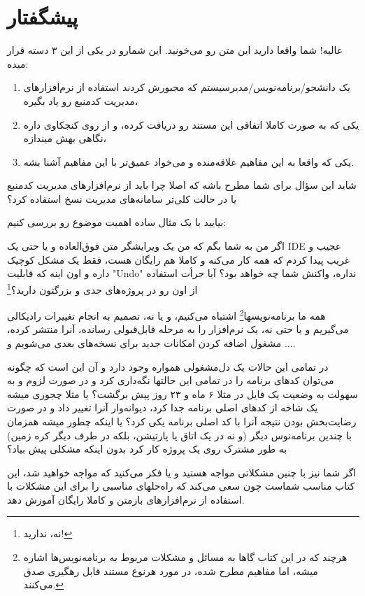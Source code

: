 \chapter{پیشگفتار}
عالیه! شما واقعا دارید این متن رو می‌خونید. این شمارو در یکی از این ۳ دسته قرار میده:
\begin{enumerate}
\item یک دانشجو/برنامه‌نویس/مدیرسیستم که مجبورش کردند استفاده از نرم‌افزارهای مدیریت کدمنبع رو یاد بگیره،
\item یکی که به صورت کاملا اتفاقی این مستند رو دریافت کرده،‌ و از روی کنجکاوی داره نگاهی بهش میندازه،
\item یکی که واقعا به این مفاهیم علاقه‌منده و می‌خواد عمیق‌تر با این مفاهیم آشنا بشه.
\end{enumerate}

شاید این سؤال برای شما مطرح باشه که اصلا چرا باید از نرم‌افزارهای مدیریت کد‌منبع یا در حالت کلی‌تر سامانه‌های مدیریت نسخ استفاده کرد؟

بیایید با یک مثال ساده اهمیت موضوع رو بررسی کنیم:

اگر من به شما بگم که من یک ویرایشگر متن فوق‌العاده و یا حتی یک IDE عجیب و غریب پیدا کردم که همه کار می‌کنه و کاملا هم رایگان هست، فقط یک مشکل کوچیک داره و اون اینه که قابلیت "Undo" نداره، واکنش شما چه خواهد بود؟ آیا جرأت استفاده از اون رو در پروژه‌های جدی و بزرگتون دارید؟\footnote{ نه، ندارید!}

همه ما برنامه‌نویسها\footnote{هرچند که در این کتاب گاها به مسائل و مشکلات مربوط به برنامه‌نویس‌ها اشاره میشه، اما مفاهیم مطرح شده، در مورد هرنوع مستند قابل رهگیری صدق می‌کنند.} اشتباه می‌کنیم، و یا نه، تصمیم به انجام تغییرات رادیکالی می‌گیریم و یا حتی نه، یک نرم‌افزار را به مرحله قابل‌قبولی رسانده، آنرا منتشر کرده، مشغول اضافه کردن امکانات جدید برای نسخه‌های بعدی می‌شویم و ....

در تمامی این حالات یک دل‌مشغولی همواره وجود دارد و آن این است که چگونه می‌توان کدهای برنامه را در تمامی این حالتها نگه‌داری کرد و در صورت لزوم و به سهولت به وضعیت یک فایل در مثلا ۶ ماه و ۲۳ روز پیش برگشت؟ یا مثلا چجوری میشه یک شاخه از کدهای اصلی برنامه جدا کرد، دیوانه‌وار آنرا تغییر داد و در صورت رضایت‌بخش بودن نتیجه آنرا با کد اصلی برنامه یکی کرد؟ یا اینکه چطور میشه همزمان با چندین برنامه‌نوس دیگر (و نه در یک اتاق یا پارتیشن، بلکه در طرف دیگر کره زمین) به طور مشترک روی یک پروژه کار کرد بدون اینکه مشکلی پیش بیاد؟

اگر شما نیز با چنین مشکلاتی مواجه هستید و یا فکر می‌کنید که مواجه خواهید شد، این کتاب مناسب شماست چون سعی می‌کند که راه‌حلهای مناسبی را برای این مشکلات با استفاده از نرم‌افزارهای بازمتن و کاملا رایگان آموزش دهد.

